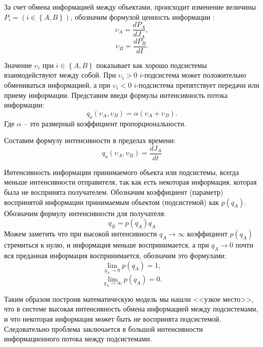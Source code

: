 За счет обмена информацией между объектами, происходит изменение величины $P_i = \left( i \in \left\{A,B \right\} \right)$, обозначим формулой ценность информации :
\begin{equation}\label{eq:cenoostinfo1}
\upsilon_A = \frac{dP_A}{dJ_A},
\end{equation}
\begin{equation}\label{eq:cenoostinfo2}
\upsilon_B = \frac{dP_B	}{dI}.
\end{equation}

Значение $\upsilon_i$ при $i \in \left\{A,B \right\}$ показывает как хорошо подсистемы взаимодействуют между собой. При $\upsilon_i > 0$ $i$-подсистема может положительно обмениваться информацией, а при $\upsilon_i < 0$ $i$-подсистема препятствует передачи или приему информации. Представим введи формулы интенсивность потока информации:
\begin{equation}\label{eq:intensive}
q_a(\upsilon_A,\upsilon_B) = \alpha (\upsilon_A + \upsilon_B).
\end{equation}
Где $\alpha$ -- это размерный коэффициент пропорциональности.

Составим формулу интенсивности в пределах времени:
\begin{equation}\label{eq:intensiveA}
q_a(\upsilon_A,\upsilon_B) = \frac{dJ_A}{dt}
\end{equation}

Интенсивность информации принимаемого объекта или подсистемы, всегда меньше интенсивности отправителя, так как есть некоторая информация, которая была не воспринята получателем. Обозначим коэффициент (параметр) воспринятой информации принимаемым объектом (подсистемой) как $p(q_A)$. Обозначим формулу интенсивности для получателя:
\begin{equation}\label{eq:intensiveB}
q_B = p(q_A)q_A
\end{equation}
Можем заметить что при высокой интенсивности $q_A \rightarrow \infty$ коэффициент $p(q_A)$ стремиться к нулю, и информация меньше воспринимается, а при $q_A \rightarrow 0$ почти вся преданная информация воспринимается, обозначим это формулами:
\begin{equation}\label{eq:lim1}
\lim_{q_A \rightarrow 0} p(q_A) = 1,
\end{equation}
\begin{equation}\label{eq:lim0}
\lim_{q_A \rightarrow \infty} p(q_A) = 0.
\end{equation}

Таким образом построив математическую модель мы нашли <<узкое место>>, что в системе высокая интенсивность обмена информацией между подсистемами, и что некоторая информация может быть не воспринята подсистемой. Следовательно проблема заключается в большой интенсивности информационного потока между подсистемами.

